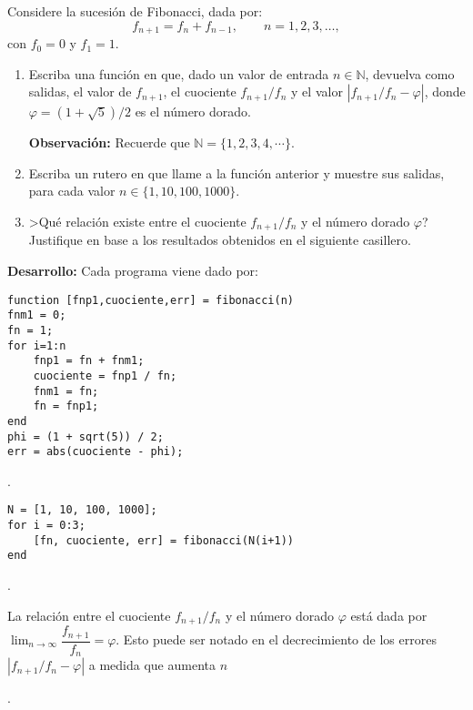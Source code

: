 Considere la sucesi\'on de Fibonacci, dada por:
$$
f_{n+1}=f_n+f_{n-1}, \qquad n=1,2,3,\ldots,
$$
con $f_0=0$ y $f_1=1$. 
\begin{enumerate}
\item Escriba una funci\'on en \matlab que, dado un valor de entrada $n\in \mathbb{N}$, devuelva como salidas, el valor de $f_{n+1}$, el cuociente $f_{n+1}/f_n$ y el valor $|f_{n+1}/f_n-\varphi|$, donde $\varphi=(1+\sqrt{5})/2$ es el n\'umero dorado.

\textbf{Observaci\'on:} Recuerde que $\mathbb{N}=\{1,2,3,4,\cdots\}$.
\item Escriba un rutero en \matlab que llame a la funci\'on anterior y muestre sus salidas, para cada valor $n\in \{1, 10, 100, 1000\}$.
\item >Qu\'e relaci\'on existe entre el cuociente $f_{n+1}/f_n$ y el n\'umero dorado $\varphi$? Justifique en base a los resultados obtenidos en el siguiente casillero.\bigskip

\respuesta{2cm}
\end{enumerate}
\textbf{Desarrollo:}  Cada programa viene dado por:
\begin{lstlisting}
function [fnp1,cuociente,err] = fibonacci(n)
fnm1 = 0;
fn = 1;
for i=1:n
    fnp1 = fn + fnm1;
    cuociente = fnp1 / fn;
    fnm1 = fn;
    fn = fnp1;
end
phi = (1 + sqrt(5)) / 2; 
err = abs(cuociente - phi);
\end{lstlisting}
\hfill{}.

\begin{lstlisting}
N = [1, 10, 100, 1000];
for i = 0:3;
    [fn, cuociente, err] = fibonacci(N(i+1))
end
\end{lstlisting}
\hfill{}.

La relaci\'on entre el cuociente $f_{n+1}/f_n$ y el n\'umero dorado $\varphi$ est\'a dada por $\displaystyle \lim_{n\to \infty}\dfrac{f_{n+1}}{f_n}=\varphi$. Esto puede ser notado en el decrecimiento de los errores $|f_{n+1}/f_n-\varphi|$ a medida que aumenta $n$

\hfill{}.
